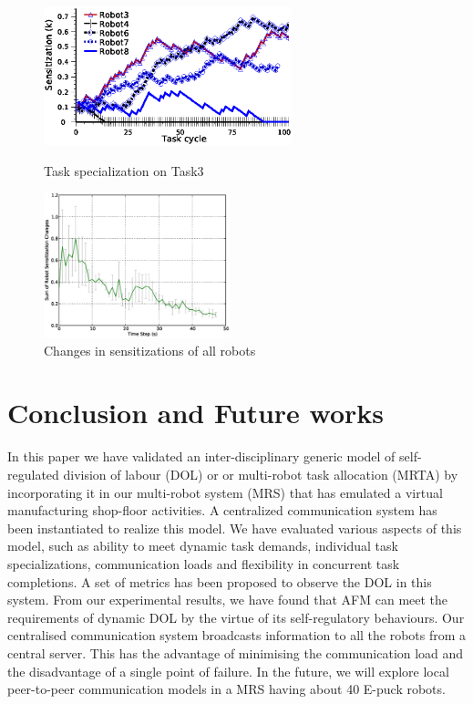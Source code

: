 \documentclass{llncs}
\begin{document}
\begin{figure}
\begin{minipage}[t]{0.48\linewidth}
\centering
\includegraphics[height=4cm, angle=0]{images/TaskSpecialization-task3-10may-1.eps}
\caption{\small Task specialization on Task3}
\label{fig:single-robot-sensitizations} %
\end{minipage} 
\hspace{0.5cm}
\begin{minipage}[t]{0.48\linewidth}
\centering
\includegraphics[height=4.2cm, angle=0]
{images/RobotSensitizationStat-Total-50steps.eps}
\caption{\small Changes in sensitizations of all robots}
\label{fig:sensitization-stat} %
\end{minipage}
\end{figure}
\section{Conclusion and Future works}
\label{sec:conc}
In this paper we have validated an inter-disciplinary generic model of self-regulated division of labour (DOL) or or multi-robot task allocation (MRTA) by incorporating it in our multi-robot system (MRS) that has emulated a virtual manufacturing shop-floor activities. A centralized communication system has been instantiated to realize this model. We have evaluated various aspects of this model, such as ability to meet dynamic task demands, individual task specializations, communication loads and flexibility in concurrent task completions. A set of metrics has been proposed to observe the DOL in this system. From our experimental results, we have found that AFM can meet the requirements of dynamic DOL by the virtue of its self-regulatory behaviours. Our centralised communication system broadcasts information to all the robots from a central server. This has the advantage of minimising the communication load and the disadvantage of a single point of failure. In the future, we will explore local peer-to-peer communication models in a MRS having about 40 E-puck robots.
\bigskip
\end{document}

